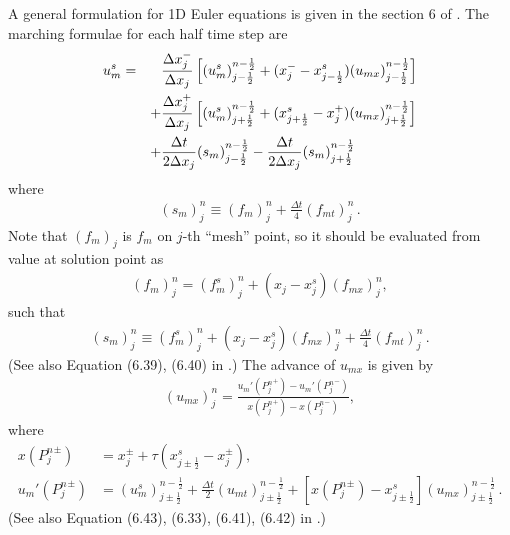 \documentclass[letterpaper,12pt,dvips]{article}
\numberwithin{equation}{section}
\begin{document}
A general formulation for 1D Euler equations is given in the section 6 of
\cite{b:chang08}.
The marching formulae for each half time step are 
\begin{alignat}{2}
u_m^s &= 
    &&\frac{\Delta x_j^-}{\Delta x_j}
      \left[
          (u_m^s)_{j-\frac{1}{2}}^{n-\frac{1}{2}}
        + (x_j^- - x_{j-\frac{1}{2}}^s)
          (u_{mx})_{j-\frac{1}{2}}^{n-\frac{1}{2}}
      \right] \notag \\
& &+ &\frac{\Delta x_j^+}{\Delta x_j}
      \left[
          (u_m^s)_{j+\frac{1}{2}}^{n-\frac{1}{2}}
        + (x_{j+\frac{1}{2}}^s - x_j^+)
          (u_{mx})_{j+\frac{1}{2}}^{n-\frac{1}{2}}
      \right] \notag \\
& &+ &\frac{\Delta t}{2\Delta x_j}(s_m)_{j-\frac{1}{2}}^{n-\frac{1}{2}}
   -  \frac{\Delta t}{2\Delta x_j}(s_m)_{j+\frac{1}{2}}^{n-\frac{1}{2}}
    \label{e:nonunisys_us}
\end{alignat}
where
\begin{align*}
  (s_m)_j^n \equiv (f_m)_j^n + \frac{\Delta t}{4}(f_{mt})_j^n \,.
\end{align*}
Note that $(f_m)_j$ is $f_m$ on $j$-th ``mesh'' point, so it should 
be evaluated from value at solution point as
\begin{align*}
  (f_m)_j^n = (f_m^s)_j^n + (x_j - x_j^s)(f_{mx})_j^n, 
\end{align*}
such that
\begin{align}
  (s_m)_j^n \equiv (f_m^s)_j^n + (x_j - x_j^s)(f_{mx})_j^n 
                 + \frac{\Delta t}{4}(f_{mt})_j^n \,.
    \label{e:nonunisys_s}
\end{align}
(See also Equation (6.39), (6.40) in \cite{b:chang08}.)
The advance of $u_{mx}$ is given by
\begin{align}
  (u_{mx})_j^n = \frac{u_m'({P_j^n}^+)-u_m'({P_j^n}^-)}
                      {x  ({P_j^n}^+)-x  ({P_j^n}^-)}, 
    \label{e:nonunisys_ux}
\end{align}
where
\begin{align}
  x({P_j^n}^{\pm}) &= 
      x_j^{\pm} + \tau(x_{j\pm\frac{1}{2}}^s-x_j^{\pm}), 
    \label{e:nonunisys_xp} \\
  u_m'({P_j^n}^{\pm}) &= 
      (u_m^s)_{j\pm\frac{1}{2}}^{n-\frac{1}{2}}
    + \frac{\Delta t}{2}(u_{mt})_{j\pm\frac{1}{2}}^{n-\frac{1}{2}}
    + \left[x({P_j^n}^{\pm})-x_{j\pm\frac{1}{2}}^s\right]
      (u_{mx})_{j\pm\frac{1}{2}}^{n-\frac{1}{2}} \,. 
    \label{e:nonunisys_upp}
\end{align}
(See also Equation (6.43), (6.33), (6.41), (6.42) in \cite{b:chang08}.)
\end{document}
